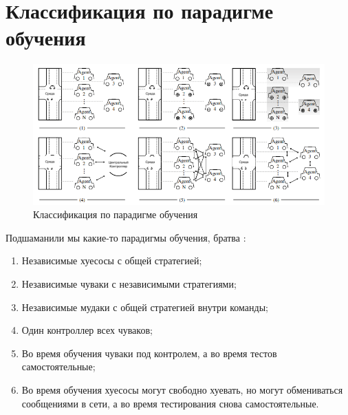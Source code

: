 %
%
%
%
\section{Классификация по парадигме обучения}

\begin{figure}[H]
	\begin{center}
	\includegraphics[pages=-, width=140mm]{./inc/img/paradigm.png}
	\caption{Классификация по парадигме обучения}
	\label{fig:paradigms}
\end{center}
\end{figure}


Подшаманили мы какие-то парадигмы обучения, братва \cite{DBLP:journals/corr/abs-2011-00583}:
\begin{enumerate}[label=\arabic*)]
\item Независимые хуесосы с общей стратегией;
\item Независимые чуваки с независимыми стратегиями;
\item Независимые мудаки с общей стратегией внутри команды;
\item Один контроллер всех чуваков;
\item Во время обучения чуваки под контролем, а во время тестов самостоятельные;
\item Во время обучения хуесосы могут свободно хуевать, но могут обмениваться сообщениями в сети, а во время тестирования снова самостоятельные.
\end{enumerate}

